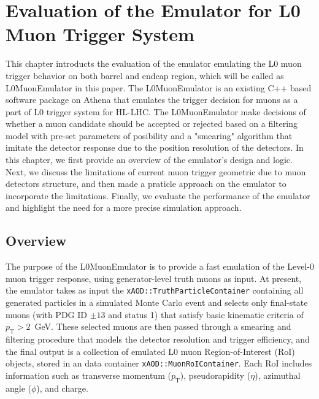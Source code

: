 \chapter{Evaluation of the Emulator for L0 Muon Trigger System} \label{ch:L0MuonEmulator}
This chapter introducts the evaluation of the emulator emulating the L0 muon trigger behavior on both barrel and endcap region, which will be called as L0MuonEmulator in this paper. The L0MuonEmulator is an existing C++ based software package on Athena that emulates the trigger decision for muons as a part of L0 trigger system for HL-LHC. The L0MuonEmulator make decisions of whether a muon candidate should be accepted or rejected based on a filtering model with pre-set parameters of posibility and a "smearing" algorithm that imitate the detector response due to the position resolution of the detectors. In this chapter, we first provide an overview of the emulator's design and logic. Next, we discuss the limitations of current muon trigger geometric due to muon detectors structure, and then made a praticle approach on the emulator to incorporate the limitations. Finally, we evaluate the performance of the emulator and highlight the need for a more precise simulation approach.
\section{Overview} \label{sec:L0MuonEmulatorOverview}
The purpose of the L0MuonEmulator is to provide a fast emulation of the Level-0 muon trigger response, using generator-level truth muons as input. At present, the emulator takes as input the \texttt{xAOD::TruthParticleContainer} containing all generated particles in a simulated Monte Carlo event and selects only final-state muons (with PDG ID $\pm13$ and status 1) that satisfy basic kinematic criteria of $p_\mathrm{T} > 2$~GeV. These selected muons are then passed through a smearing and filtering procedure that models the detector resolution and trigger efficiency, and the final output is a collection of emulated L0 muon Region-of-Interest (RoI) objects, stored in an data container \texttt{xAOD::MuonRoIContainer}. Each RoI includes information such as transverse momentum ($p_\mathrm{T}$), pseudorapidity ($\eta$), azimuthal angle ($\phi$), and charge.

